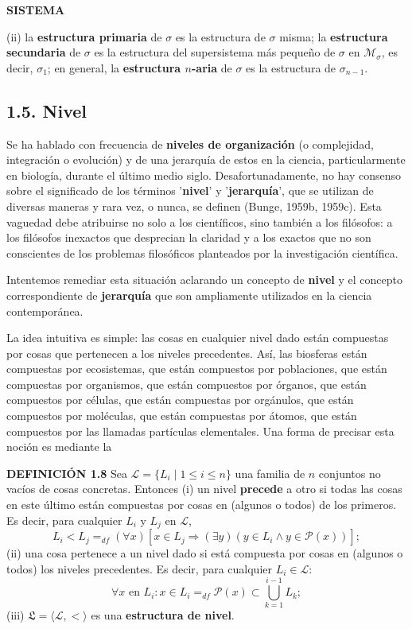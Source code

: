 
\newpage
\fancyhf{}
\fancyhead[r]{\thepage} 
\begin{center}
{\fontsize{13}{16}\selectfont \textbf{SISTEMA}}
\end{center}
\vspace{0.5cm}

{\fontsize{13}{15}\selectfont
(ii) la \textbf{estructura primaria} de $\sigma$ es la estructura de $\sigma$ misma; la \textbf{estructura secundaria} de $\sigma$ es la estructura del supersistema más pequeño de $\sigma$ en $\mathcal{M}_{\sigma}$, es decir, $\sigma_1$; en general, la \textbf{estructura $n$-aria} de $\sigma$ es la estructura de $\sigma_{n-1}$.

\subsection*{1.5. Nivel}
Se ha hablado con frecuencia de \textbf{niveles de organización} (o complejidad, integración o evolución) y de una jerarquía de estos en la ciencia, particularmente en biología, durante el último medio siglo. Desafortunadamente, no hay consenso sobre el significado de los términos '\textbf{nivel}' y '\textbf{jerarquía}', que se utilizan de diversas maneras y rara vez, o nunca, se definen (Bunge, 1959b, 1959c). Esta vaguedad debe atribuirse no solo a los científicos, sino también a los filósofos: a los filósofos inexactos que desprecian la claridad y a los exactos que no son conscientes de los problemas filosóficos planteados por la investigación científica.

Intentemos remediar esta situación aclarando un concepto de \textbf{nivel} y el concepto correspondiente de \textbf{jerarquía} que son ampliamente utilizados en la ciencia contemporánea.

La idea intuitiva es simple: las cosas en cualquier nivel dado están compuestas por cosas que pertenecen a los niveles precedentes. Así, las biosferas están compuestas por ecosistemas, que están compuestos por poblaciones, que están compuestas por organismos, que están compuestos por órganos, que están compuestos por células, que están compuestas por orgánulos, que están compuestos por moléculas, que están compuestas por átomos, que están compuestos por las llamadas partículas elementales. Una forma de precisar esta noción es mediante la

\textbf{DEFINICIÓN 1.8} Sea $\mathcal{L} = \{L_i \mid 1 \le i \le n\}$ una familia de $n$ conjuntos no vacíos de cosas concretas. Entonces
(i) un nivel \textbf{precede} a otro si todas las cosas en este último están compuestas por cosas en (algunos o todos) de los primeros. Es decir, para cualquier $L_i$ y $L_j$ en $\mathcal{L}$,
$$ L_i < L_j =_{df} (\forall x)[x \in L_j \Rightarrow (\exists y) (y \in L_i \land y \in \mathcal{P}(x))] ; $$
(ii) una cosa pertenece a un nivel dado si está compuesta por cosas en (algunos o todos) los niveles precedentes. Es decir, para cualquier $L_i \in \mathcal{L}$:
$$ \forall x \text{ en } L_i : x \in L_i =_{df} \mathcal{P}(x) \subset \bigcup_{k=1}^{i-1} L_k ; $$
(iii) $\mathfrak{L} = \langle \mathcal{L}, < \rangle$ es una \textbf{estructura de nivel}.

}
